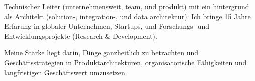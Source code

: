 


\begin{cvparagraph}



Technischer Leiter (unternehmensweit, team, und produkt) mit ein hintergrund als Architekt (solution-, integration-, und data architektur). Ich bringe 15 Jahre Erfarung in globaler Unternehmen, Startups, und Forschungs- und Entwicklungsprojekte (Research \& Development).

Meine Stärke liegt darin, Dinge ganzheitlich zu betrachten und Geschäftsstrategien in Produktarchitekturen, organisatorische Fähigkeiten und langfristigen Geschäftswert umzusetzen.



%
%
%



\end{cvparagraph}
